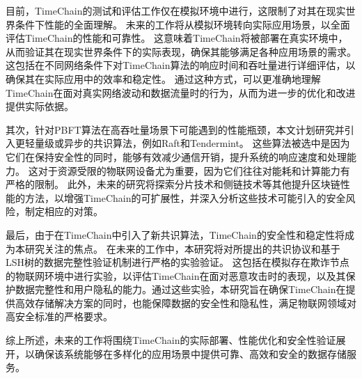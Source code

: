 目前，TimeChain的测试和评估工作仅在模拟环境中进行，这限制了对其在现实世界条件下性能的全面理解。
未来的工作将从模拟环境转向实际应用场景，以全面评估TimeChain的性能和可靠性。
这意味着TimeChain将被部署在真实环境中，从而验证其在现实世界条件下的实际表现，确保其能够满足各种应用场景的需求。
这包括在不同网络条件下对TimeChain算法的响应时间和吞吐量进行详细评估，以确保其在实际应用中的效率和稳定性。
通过这种方式，可以更准确地理解TimeChain在面对真实网络波动和数据流量时的行为，从而为进一步的优化和改进提供实际依据。

其次，针对PBFT算法在高吞吐量场景下可能遇到的性能瓶颈，本文计划研究并引入更轻量级或异步的共识算法，例如Raft和Tendermint。
这些算法被选中是因为它们在保持安全性的同时，能够有效减少通信开销，提升系统的响应速度和处理能力。
这对于资源受限的物联网设备尤为重要，因为它们往往对能耗和计算能力有严格的限制。
此外，未来的研究将探索分片技术和侧链技术等其他提升区块链性能的方法，以增强TimeChain的可扩展性，并深入分析这些技术可能引入的安全风险，制定相应的对策。

最后，由于在TimeChain中引入了新共识算法，TimeChain的安全性和稳定性将成为本研究关注的焦点。
在未来的工作中，本研究将对所提出的共识协议和基于LSH树的数据完整性验证机制进行严格的实验验证。
这包括在模拟存在欺诈节点的物联网环境中进行实验，以评估TimeChain在面对恶意攻击时的表现，以及其保护数据完整性和用户隐私的能力。通过这些实验，本研究旨在确保TimeChain在提供高效存储解决方案的同时，也能保障数据的安全性和隐私性，满足物联网领域对高安全标准的严格要求。

综上所述，未来的工作将围绕TimeChain的实际部署、性能优化和安全性验证展开，以确保该系统能够在多样化的应用场景中提供可靠、高效和安全的数据存储服务。
